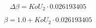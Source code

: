 \begin{equation}
    \Delta \beta = KoU_{2} \cdot 0.026193405
\end{equation}

\begin{equation}
    \beta = 1.0 + KoU_{2} \cdot 0.026193405
\end{equation}
